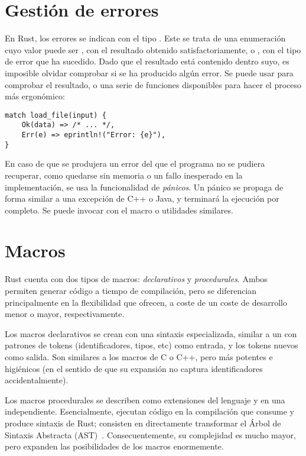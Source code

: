 \section{Gestión de errores}

En Rust, los errores se indican con el tipo . Este se trata
de una enumeración cuyo valor puede ser , con el resultado obtenido
satisfactoriamente, o , con el tipo de error que ha sucedido. Dado
que el resultado está contenido dentro suyo, es imposible olvidar comprobar si
se ha producido algún error. Se puede usar  para comprobar el
resultado, o una serie de funciones disponibles para hacer el proceso más
ergonómico:

\begin{verbatim}
match load_file(input) {
    Ok(data) => /* ... */,
    Err(e) => eprintln!("Error: {e}"),
}
\end{verbatim}

En caso de que se produjera un error del que el programa no se pudiera
recuperar, como quedarse sin memoria o un fallo inesperado en la implementación,
se usa la funcionalidad de \emph{pánicos}. Un pánico se propaga de forma similar
a una excepción de C++ o Java, y terminará la ejecución por completo. Se puede
invocar con el macro  o utilidades similares.

\section{Macros}

Rust cuenta con dos tipos de macros: \emph{declarativos} y \emph{procedurales}.
Ambos permiten generar código a tiempo de compilación, pero se diferencian
principalmente en la flexibilidad que ofrecen, a coste de un coste de desarrollo
menor o mayor, respectivamente.

Los macros declarativos se crean con una sintaxis especializada, similar a un
 con patrones de tokens (identificadores, tipos, etc) como entrada,
y los tokens nuevos como salida. Son similares a los macros de C o C++, pero más
potentes e higiénicos (en el sentido de que su expansión no captura
identificadores accidentalmente).

Los macros procedurales se describen como extensiones del lenguaje y en una
\crate independiente. Esencialmente, ejecutan código en la compilación que
consume y produce sintaxis de Rust; consisten en directamente transformar el
Árbol de Sintaxis Abstracta (AST)~\cite[Procedural Macros]{rustref}.
Consecuentemente, su complejidad es mucho mayor, pero expanden las posibilidades
de los macros enormemente.

